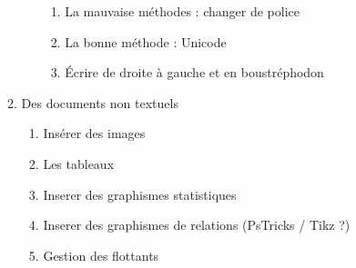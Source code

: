 \begin{enumerate}
\begin{enumerate}
\begin{enumerate}
\begin{enumerate}
			\item La mauvaise méthodes : changer de police
			\item La bonne méthode : Unicode
			\item Écrire de droite à gauche et en boustréphodon
		\end{enumerate}
		\end{enumerate}
	\item Des documents non textuels
		\begin{enumerate}
		\item Insérer des images
		\item Les tableaux
		\item Inserer des graphismes statistiques
		\item Inserer des graphismes de relations (PsTricks / Tikz ?)
		\item Gestion des flottants
		\end{enumerate}
\end{enumerate}


\end{enumerate}
